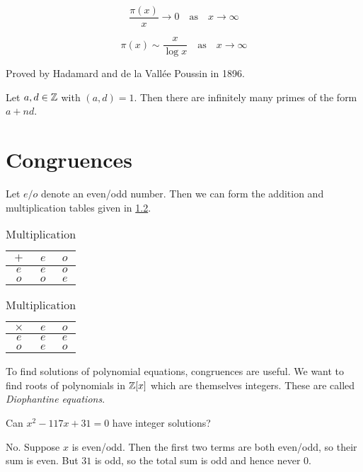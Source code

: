\begin{fact}
    \[
        \frac{\pi(x)}{x} \to 0 \quad\text{as}\quad x \to \infty
    \]
\end{fact}

\begin{fact*} \label{thm:nt:pnt}
    \[
        \pi(x) \sim \frac{x}{\log x} \quad\text{as}\quad x \to \infty
    \]
\end{fact*}
Proved by Hadamard and de la Vallée Poussin in 1896.

\begin{theorem}[Dirichlet] \label{thm:dirichlet}
    Let $a, d \in \mathbb{Z}$ with $(a, d) = 1$.
    Then there are infinitely many primes of the form $a + nd$.
\end{theorem}

\chapter{Congruences} \label{chp:congruences}
Let $e / o$ denote an even/odd number.
Then we can form the addition and multiplication tables given in
\cref{tab:congruences:mod2}.
\begin{table}
    \centering
    \caption{Addition and multiplication tables modulo $2$}
    \label{tab:congruences:mod2}
    \begin{subtable}{.5\textwidth}
        \centering
        \begin{tabular}{c|cc}
            $+$ & $e$ & $o$ \\
            \hline
            $e$ & $e$ & $o$ \\
            $o$ & $o$ & $e$
        \end{tabular}
        \caption{Addition}
    \end{subtable}%
    \begin{subtable}{.5\textwidth}
        \centering
        \begin{tabular}{c|cc}
            $\times$ & $e$ & $o$ \\
            \hline
            $e$ & $e$ & $e$ \\
            $o$ & $e$ & $o$
        \end{tabular}
        \caption{Multiplication}
    \end{subtable}
\end{table}

To find solutions of polynomial equations, congruences are useful.
We want to find roots of polynomials in $\mathbb{Z}[x]$ which are themselves
integers.
These are called \emph{Diophantine equations}.
\begin{example}
    Can $x^2 - 117x + 31 = 0$ have integer solutions?

    No.
    Suppose $x$ is even/odd.
    Then the first two terms are both even/odd, so their sum is even.
    But $31$ is odd, so the total sum is odd and hence never $0$.
\end{example}
